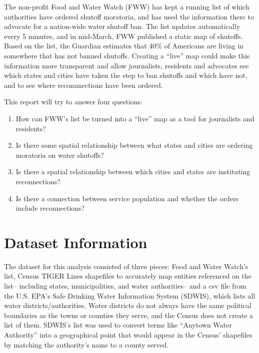 \documentclass[
  12pt,
]{article}
\providecommand{\tightlist}{%
  \setlength{\itemsep}{0pt}\setlength{\parskip}{0pt}}
\begin{document}
The non-profit Food and Water Watch (FWW) has kept a running list of
which authorities have ordered shutoff moratoria, and has used the
information there to advocate for a nation-wide water shutoff ban. The
list updates automatically every 5 minutes, and in mid-March, FWW
published a static map of shutoffs. Based on the list, the Guardian
estimates that 40\% of Americans are living in somewhere that has not
banned shutoffs. Creating a ``live'' map could make this information
more transparent and allow journalists, residents and advocates see
which states and cities have taken the step to ban shutoffs and which
have not, and to see where reconnnections have been ordered.

This report will try to answer four questions:

\begin{enumerate}
\def\labelenumi{\arabic{enumi}.}
\tightlist
\item
  How can FWW's list be turned into a ``live'' map as a tool for
  journalists and residents?
\item
  Is there some spatial relationship between what states and cities are
  ordering moratoria on water shutoffs?
\item
  Is there a spatial relationship between which cities and states are
  instituting reconnections?
\item
  Is there a connection between service population and whether the
  orders include reconnections?
\end{enumerate}

\newpage

\hypertarget{dataset-information}{%
\section{Dataset Information}\label{dataset-information}}

The dataset for this analysis consisted of three pieces: Food and Water
Watch's list, Census TIGER Lines shapefiles to accurately map entities
referenced on the list-- including states, municipalities, and water
authorities-- and a csv file from the U.S. EPA's Safe Drinking Water
Information System (SDWIS), which lists all water districts/authorities.
Water districts do not always have the same political boundaries as the
towns or counties they serve, and the Census does not create a list of
them. SDWIS's list was used to convert terms like ``Anytown Water
Authority'' into a geographical point that would appear in the Census'
shapefiles by matching the authority's name to a county served.
\end{document}
